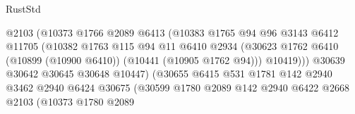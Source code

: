\begin{lexlean}{RustStd}
\begin{coremodule}
                                          @2103
                                          (@10373
                                            @1766
                                            @2089
                                            @6413
                                            (@10383
                                              @1765
                                              @94
                                              @96
                                              @3143
                                              @6412
                                              @11705
                                              (@10382
                                                @1763
                                                @115
                                                @94
                                                @11
                                                @6410
                                                @2934
                                                (@30623
                                                  @1762
                                                  @6410
                                                  (@10899 (@10900 @6410))
                                                  (@10441 (@10905 @1762 @94)))
                                                @10419)))
                                          @30639
                                          @30642
                                          @30645
                                          @30648
                                          @10447)
                                        (@30655
                                          @6415
                                          @531
                                          @1781
                                          @142
                                          @2940
                                          @3462
                                          @2940
                                          @6424
                                          @30675
                                          (@30599
                                            @1780
                                            @2089
                                            @142
                                            @2940
                                            @6422
                                            @2668
                                            @2103
                                            (@10373
                                              @1780
                                              @2089

\end{coremodule}
\end{lexlean}
